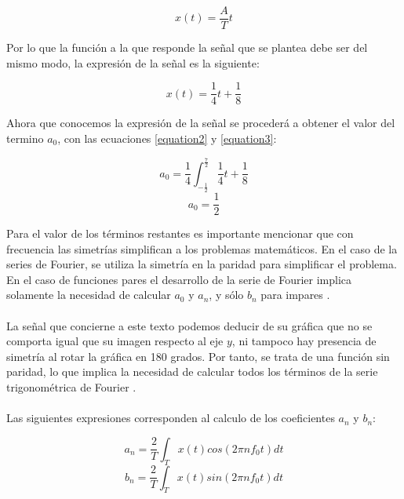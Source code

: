 \documentclass[12pt]{article}
\begin{document}
    \begin{equation*}
        x(t)=\frac{A}{T} t
    \end{equation*}

    Por lo que la función a la que responde la señal que se plantea debe ser del mismo modo, la expresión 
    de la señal es la siguiente:

    \begin{equation}
        x(t)=\frac{1}{4} t+\frac{1}{8}
        \label{equation3}
    \end{equation}

    Ahora que conocemos la expresión de la señal se procederá a obtener el valor del termino $a_{0}$, con las 
    ecuaciones \ref{equation2} y \ref{equation3}:

    \begin{equation*}
        a_{0}=\frac{1}{4} \int_{-\frac{1}{2}}^{\frac{7}{2}} \frac{1}{4} t+\frac{1}{8}
    \end{equation*}
    \begin{equation}
        a_{0}=\frac{1}{2}
        \label{equation4}
    \end{equation}    

    Para el valor de los términos restantes es importante mencionar que con frecuencia las simetrías simplifican 
    a los problemas matemáticos. En el caso de la series de Fourier, se utiliza la simetría en la paridad para 
    simplificar el problema. En el caso de funciones pares el desarrollo de la serie de Fourier implica solamente 
    la necesidad de calcular $a_{0}$ y $a_{n}$, y sólo $b_{n}$ para impares \cite{parimpar}.\\
    \\
    La señal que concierne a este texto podemos deducir de su gráfica que no se comporta igual que su imagen respecto 
    al eje $y$, ni tampoco hay presencia de simetría al rotar la gráfica en 180 grados. Por tanto, se trata de una 
    función sin paridad, lo que implica la necesidad de calcular todos los términos de la serie trigonométrica de Fourier .\\
    \\
    Las siguientes expresiones corresponden al calculo de los coeficientes $a_{n}$ y $b_{n}$:

    \begin{equation}
        a_{n}=\frac{2}{T} \int_{T} x(t)cos(2\pi nf_{0}t)dt
        \label{equation5}
    \end{equation}
    \begin{equation}
        b_{n}=\frac{2}{T} \int_{T} x(t)sin(2\pi nf_{0}t)dt
        \label{equation6}
    \end{equation}
\end{document}
